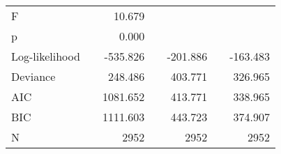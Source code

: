\begin{tabular}{lcD{.}{.}{7}cD{.}{.}{7}cD{.}{.}{7}}
F                          &  &     10.679   &&              &&             \\
p                          &  &      0.000   &&              &&             \\
Log-likelihood             &  &   -535.826   &&   -201.886   &&   -163.483  \\
Deviance                   &  &    248.486   &&    403.771   &&    326.965  \\
AIC                        &  &   1081.652   &&    413.771   &&    338.965  \\
BIC                        &  &   1111.603   &&    443.723   &&    374.907  \\
N                          &  &   2952       &&   2952       &&   2952      \\
\bottomrule
\end{tabular}
